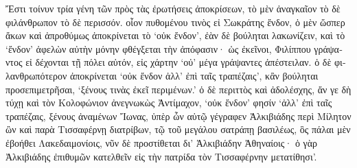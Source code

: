 {\large
\begin{greek}
\noindent  Ἔστι τοίνυν τρία γένη τῶν πρὸς τὰς ἐρωτήσεις ἀποκρίσεων, τὸ μὲν ἀναγκαῖον τὸ δὲ φιλάνθρωπον τὸ δὲ περισσόν. οἷον πυθομένου τινὸς εἰ Σωκράτης ἔνδον, ὁ μὲν ὥσπερ ἄκων καὶ ἀπροθύμως ἀποκρίνεται τὸ ‘οὐκ ἔνδον’, ἐὰν δὲ βούληται λακωνίζειν, καὶ τὸ ‘ἔνδον’ ἀφελὼν αὐτὴν μόνην φθέγξεται τὴν ἀπόφασιν· ὡς ἐκεῖνοι, Φιλίππου γράψαντος εἰ δέχονται τῇ πόλει αὐτόν, εἰς χάρτην ‘οὐ’ μέγα γράψαντες ἀπέστειλαν. ὁ δὲ φιλανθρωπότερον ἀποκρίνεται ‘οὐκ ἔνδον ἀλλ' ἐπὶ ταῖς τραπέζαις’, κἂν βούληται προσεπιμετρῆσαι, ‘ξένους τινὰς ἐκεῖ περιμένων.’ ὁ δὲ περιττὸς καὶ ἀδολέσχης, ἄν γε δὴ τύχῃ καὶ τὸν Κολοφώνιον ἀνεγνωκὼς Ἀντίμαχον, ‘οὐκ ἔνδον’ φησίν ‘ἀλλ' ἐπὶ ταῖς τραπέζαις, ξένους ἀναμένων  Ἴωνας, ὑπὲρ ὧν αὐτῷ γέγραφεν Ἀλκιβιάδης περὶ Μίλητον ὢν καὶ παρὰ Τισσαφέρνῃ διατρίβων, τῷ τοῦ μεγάλου σατράπῃ βασιλέως, ὃς πάλαι μὲν ἐβοήθει Λακεδαιμονίοις, νῦν δὲ προστίθεται δι' Ἀλκιβιάδην Ἀθηναίοις· ὁ γὰρ Ἀλκιβιάδης ἐπιθυμῶν κατελθεῖν εἰς τὴν πατρίδα τὸν Τισσαφέρνην μετατίθησι’.

\end{greek}
}

